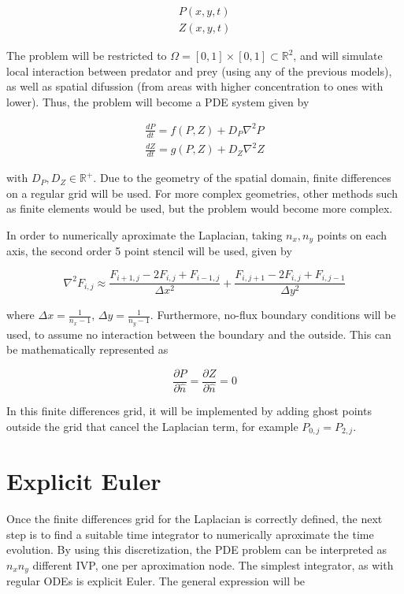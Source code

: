 \documentclass[11pt,oneside,parskip=half]{scrbook}  %
\begin{document}
$$
\begin{matrix}
P(x,y,t) \\
Z(x,y,t)
\end{matrix}
$$

The problem will be restricted to $\Omega=[0,1]\times[0,1]\subset\mathbb R^2$, and will simulate local interaction between predator and prey (using any of the previous models), as well as spatial difussion (from areas with higher concentration to ones with lower). Thus, the problem will become a PDE system given by

$$
\begin{matrix}
\frac{dP}{dt}=f(P,Z)+ D_P\nabla^2 P \\
\frac{dZ}{dt}=g(P,Z)+ D_Z\nabla^2 Z
\end{matrix}
$$

with $D_P,D_Z\in\mathbb R^+$. Due to the geometry of the spatial domain, finite differences on a regular grid will be used. For more complex geometries, other methods such as finite elements would be used, but the problem would become more complex.

In order to numerically aproximate the Laplacian, taking $n_x,n_y$ points on each axis, the second order 5 point stencil will be used, given by

$$
\nabla^2 F_{i,j}\approx\frac{F_{i+1,j}-2F_{i,j}+F_{i-1,j}}{\Delta x^2}+\frac{F_{i,j+1}-2F_{i,j}+F_{i,j-1}}{\Delta y^2}
$$

where $\Delta x=\frac1{n_x-1},\,\Delta y=\frac1{n_y-1}$. Furthermore, no-flux boundary conditions will be used, to assume no interaction between the boundary and the outside. This can be mathematically represented as

$$
\frac{\partial P}{\partial\hat n}=\frac{\partial Z}{\partial\hat n}=0
$$

In this finite differences grid, it will be implemented by adding ghost points outside the grid that cancel the Laplacian term, for example $P_{0,j}=P_{2,j}$.

\section{Explicit Euler}

Once the finite differences grid for the Laplacian is correctly defined, the next step is to find a suitable time integrator to numerically aproximate the time evolution. By using this discretization, the PDE problem can be interpreted as $n_xn_y$ different IVP, one per aproximation node. The simplest integrator, as with regular ODEs is explicit Euler. The general expression will be
\end{document}
